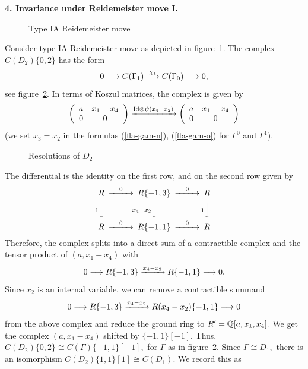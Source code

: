 \documentclass[12pt]{article}
\begin{document}
\vspace{0.1in} 


{\bf 4. Invariance under Reidemeister move I.} 

\begin{figure}  \caption{Type IA Reidemeister move} 
 \label{curl1} \end{figure}
Consider type IA Reidemeister move as depicted in figure~\ref{curl1}. 
The complex $C(D_2)\{0,2\}$ has the form 
$$ 0 \longrightarrow C(\Gamma_1) \stackrel{\chi_1}{\longrightarrow} C(\Gamma_0) \longrightarrow 0, $$ 
see figure~\ref{digon}. In terms of Koszul matrices, the complex is 
given by  
$$ \left( \begin{array}{cc} a & x_1 -x_4 \\ 0 & 0 \end{array} 
 \right) \xrightarrow{\mathrm{Id} \otimes \psi(x_4-x_2)}
  \left( \begin{array}{cc} a & x_1 -x_4 \\ 0 & 0 \end{array} 
 \right) $$
(we set $x_3=x_2$ in the formulas (\ref{fla-gam-n}), (\ref{fla-gam-o}) 
for $\Gamma^0$ and $\Gamma^1$). 


\begin{figure}  \caption{Resolutions of $D_2$} 
 \label{digon} \end{figure}

The differential is the identity on the first row, and on the second 
row given by 
 \begin{equation*}
   \begin{CD}
     R @>{0}>> R\{-1,3\} @>{0}>> R  \\
     @V{1}VV      @V{x_4-x_2}VV   @V{1}VV \\
     R @>{0}>> R\{-1,1\} @>{0}>> R
   \end{CD}
 \end{equation*}
Therefore, the complex splits into a direct sum of a contractible 
complex and the tensor product of $(a, x_1-x_4)$ with 
 $$ 0 \longrightarrow R\{-1,3\} \xrightarrow{x_4-x_2} R\{-1,1\} \longrightarrow 0.$$ 
Since $x_2$ is an internal variable, we can remove a contractible 
summand
 $$  0 \longrightarrow R\{-1,3\} \xrightarrow{x_4-x_2} R(x_4-x_2)\{-1,1\} \longrightarrow 0$$
from the above complex and reduce the ground ring to $R'=\mathbb Q[a,x_1,x_4].$ 
We get the complex $(a, x_1-x_4)$ shifted by $\{-1,1\}[-1].$ 
Thus, $C(D_2)\{0,2\}\cong C(\Gamma)\{-1,1\}[-1],$ for $\Gamma$ 
as in figure~\ref{digon}. Since $\Gamma\cong D_1,$ there is an 
isomorphism $C(D_2)\{1,1\}[1]\cong C(D_1).$ We record this as 
\end{document}
